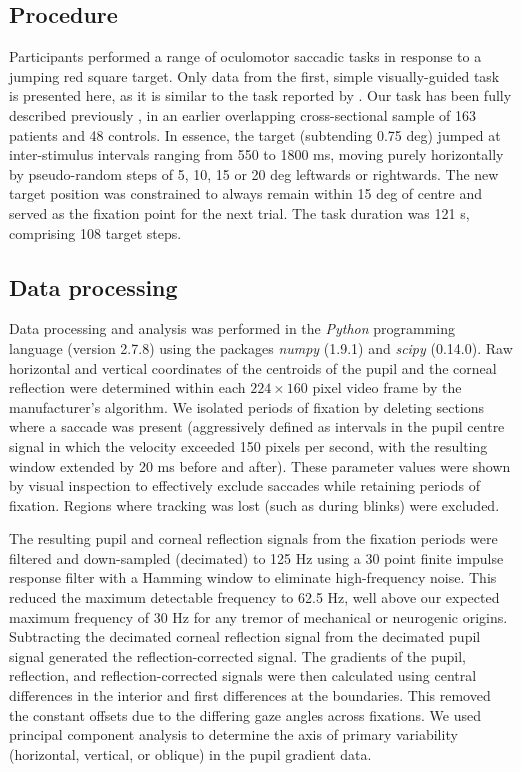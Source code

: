 \documentclass[jou,a4paper]{apa6}
\begin{document}
\subsection{Procedure}
Participants performed a range of oculomotor saccadic tasks in response to a jumping red square target. Only data from the first, simple visually-guided task is presented here, as it is similar to the task reported by \cite{Gitchel2012Pervasive-ocula}. Our task has been fully described previously \citep{MacAskill2012The-influence-o}, in an earlier overlapping cross-sectional sample of 163 patients and 48 controls.
In essence, the target (subtending 0.75 deg) jumped at inter-stimulus intervals ranging from 550 to 1800 ms, moving purely horizontally by pseudo-random steps of 5, 10, 15 or 20 deg leftwards or rightwards. The new target position was constrained to always remain within 15 deg of centre and served as the fixation point for the next trial. The task duration was 121 s, comprising 108 target steps.

\subsection{Data processing}
Data processing and analysis was performed in the \textit{Python} programming language (version 2.7.8) using the packages \textit{numpy} (1.9.1) and \textit{scipy} (0.14.0). Raw horizontal and vertical coordinates of the centroids of the pupil and the corneal reflection were determined within each $224 \times 160$ pixel video frame by the manufacturer's algorithm. We isolated periods of fixation by deleting sections where a saccade was present (aggressively defined as intervals in the pupil centre signal in which the velocity exceeded 150 pixels per second, with the resulting window extended by 20 ms before and after). These parameter values were shown by visual inspection to effectively exclude saccades while retaining periods of fixation. Regions where tracking was lost (such as during blinks) were excluded.

The resulting pupil and corneal reflection signals from the fixation periods were filtered and down-sampled (decimated) to 125 Hz using a 30 point finite impulse response filter with a Hamming window to eliminate high-frequency noise. This reduced the maximum detectable frequency to 62.5 Hz, well above our expected maximum frequency of 30 Hz for any tremor of mechanical or neurogenic origins. Subtracting the decimated corneal reflection signal from the decimated pupil signal generated the reflection-corrected signal. The gradients of the pupil, reflection, and reflection-corrected signals were then calculated using central differences in the interior and first differences at the boundaries. This removed the constant offsets due to the differing gaze angles across fixations. We used principal component analysis to determine the axis of primary variability (horizontal, vertical, or oblique) in the pupil gradient data.
\end{document}
